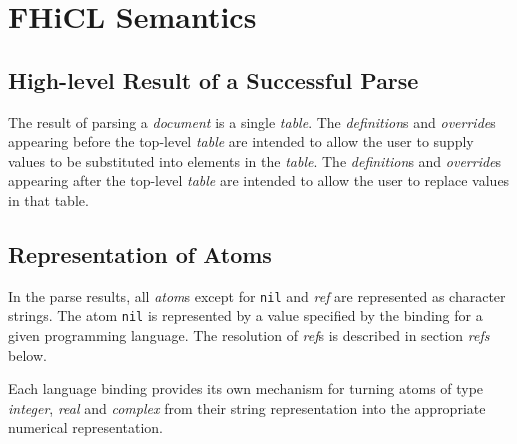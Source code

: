 \documentclass{memarticle}
\begin{document}
\chapter{FHiCL Semantics}{
        \section{High-level Result of a Successful Parse}
                The result of parsing a \emph{document}
                is a single \emph{table}.
                The \emph{definition}s and \emph{override}s
                appearing before the top-level \emph{table}
                are intended to allow the user
                to supply values to be substituted into elements in the \emph{table}.
                The \emph{definition}s and \emph{override}s
                appearing after the top-level \emph{table}
                are intended to allow the user
                to replace values in that table.

        \section{Representation of Atoms}
                In the parse results,
                all \emph{atom}s
                except for \texttt{nil} and \emph{ref}
                are represented
                as character strings.
                The atom \texttt{nil} is represented by a 
                value specified by the binding for a given programming language.
                The resolution of \emph{ref}s is described in section \emph{refs} below.
                \par
                Each language binding
                provides its own mechanism
                for turning atoms of type \emph{integer}, \emph{real} and \emph{complex}
                from their string representation
                into the appropriate numerical representation.
}
\end{document}
